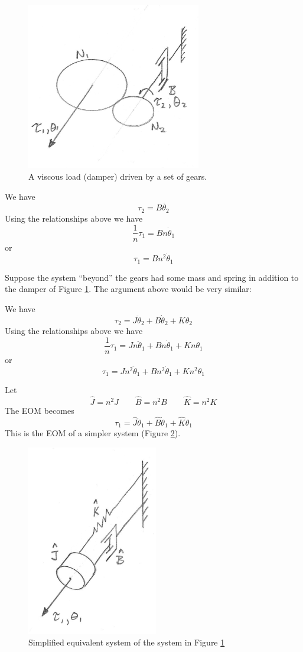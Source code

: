 \begin{figure}\centering
\includegraphics[width=3.0in]{figs03/00745.png}
\caption{A viscous load (damper) driven by a set of gears.}\label{dampergears}
\end{figure}

We have
\[
\tau_2 = B \dot{\theta_2}
\]
Using the relationships above we have
\[
\frac{1}{n}\tau_1 = Bn\dot{\theta}_1
\]
or
\[
\tau_1 = Bn^2\dot{\theta}_1
\]

Suppose the system ``beyond'' the gears had some mass and spring in addition to the damper of Figure \ref{dampergears}. The argument above would be very similar: 

We have
\[
\tau_2 = J \ddot{\theta}_2 + B \dot{\theta}_2 + K \theta_2
\]
Using the relationships above we have
\[
\frac{1}{n}\tau_1 =J n \ddot{\theta}_1 + B n\dot{\theta}_1 + K n\theta_1
\]
or
\[
\tau_1 =J n^2 \ddot{\theta}_1 + B n^2\dot{\theta}_1 + K n^2\theta_1
\]

Let 
\[
\hat{J} = n^2J \qquad \hat{B} = n^2B \qquad \hat{K} = n^2 K
\]
The EOM becomes
\[
\tau_1 =\hat{J}\ddot{\theta}_1 + \hat{B} \dot{\theta}_1 + \hat{K} \theta_1
\]
This is the EOM of a simpler system (Figure \ref{simplifiedgearsys}). 

\begin{figure}\centering
\includegraphics[width=2.25in]{figs03/00746.png}
\caption{Simplified equivalent system of the system in Figure \ref{dampergears}}\label{simplifiedgearsys}
\end{figure}



